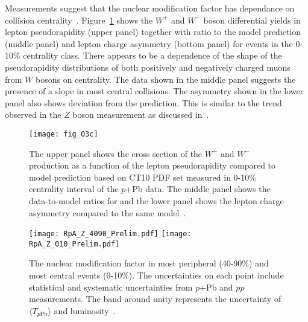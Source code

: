 \documentclass[3p,times,twocolumn]{elsarticle}
\newcommand*{\pPb}{\ensuremath{p}+Pb\xspace}
\newcommand*{\Zboson}{\ensuremath{Z}\xspace}
\newcommand*{\Wboson}{\ensuremath{W}\xspace}
\newcommand*{\pp}{\ensuremath{pp}\xspace}
\newcommand*{\Tppb}{\ensuremath{T_{p\mathrm{Pb}}}\xspace}
\newcommand*{\avgTppb}{\ensuremath{\langle\Tppb\rangle}\xspace}
\begin{document}

Measurements suggest that the nuclear modification factor has dependance on collision centrality~\cite{Aad:2015gta, Markus:2015}. Figure~\ref{fig:WpPb_010} shows the $W^{+}$ and $W^{-}$ boson differential yields in lepton pseudorapidity (upper panel) together with ratio to the model prediction (middle panel) and lepton charge asymmetry (bottom panel)  for events in the 0-10\% centrality class. There appears to be a dependence of the shape of the pseudorapidity distributions of both positively and negatively charged muons from \Wboson bosons on centrality. The data shown in the middle panel suggests the presence of a slope in most central collisions. The asymmetry shown in the lower panel also shows deviation from the prediction. This is similar to the trend observed in the \Zboson boson measurement as discussed in~\cite{Aad:2015gta}.

\begin{figure}[ht!]
\centering
\texttt{[image: fig\_03c]}
\caption{The upper panel shows the cross section of the $W^{+}$ and $W^{-}$ production as a function of the lepton pseudorapidity compared to model prediction based on CT10 PDF set measured in 0-10\% centrality interval of the \pPb data. The middle panel shows the data-to-model ratios for and the lower panel shows the lepton charge asymmetry compared to the same model~\cite{Markus:2015}.}
\label{fig:WpPb_010}
\end{figure} 


\begin{figure}[ht!] %
\centering
\texttt{[image: RpA\_Z\_4090\_Prelim.pdf]}
\texttt{[image: RpA\_Z\_010\_Prelim.pdf]}
\caption{The nuclear modification factor in most peripheral (40-90\%) and most central events (0-10\%). The uncertainties on each point include statistical and systematic uncertainties from \pPb and \pp measurements.  The band around unity represents the uncertainty of \avgTppb and luminosity~\cite{me:2016}.}
\label{fig:Rpa_centrality}
\end{figure}
\end{document}
